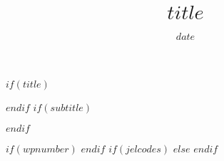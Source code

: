 
\setlength{\TPHorizModule}{1cm}
\setlength{\TPVertModule}{1cm}
\def\placefig#1#2#3#4{\begin{textblock}{.1}(#1,#2)\rlap{\texttt{[image: \#4]}}\end{textblock}}


$if(title)$
\title{$title$}
$endif$
$if(subtitle)$
\usepackage{etoolbox}
\makeatletter
\providecommand{\subtitle}[1]{%
  \apptocmd{\@title}{\par {\large #1 \par}}{}{}
}
\makeatother
\subtitle{$subtitle$}
$endif$
\date{$date$}

\def\Date{\number\day}
\def\Month{\ifcase\month\or
 January\or February\or March\or April\or May\or June\or
 July\or August\or September\or October\or November\or December\fi}
\def\Year{\number\year}


\makeatletter
\def\wp#1{\gdef\@wp{#1}}\def\@wp{??/??}
\def\jel#1{\gdef\@jel{#1}}\def\@jel{??}
\def\showjel{{\large\textsf{\textbf{JEL classification:}}~\@jel}}
\def\nojel{\def\showjel{}}
\makeatother

$if(wpnumber)$
\wp{$wpnumber$}
$endif$
$if(jelcodes)$
\jel{$jelcodes$}
$else$
\nojel
$endif$


\makeatletter
\def\cover{{\sffamily\setcounter{page}{0}
        \thispagestyle{empty}
        \placefig{13}{1.5}{width=5cm}{$companylogo$}
        \vspace*{4.5cm}
        \begin{center}
        \parbox{14cm}{\begin{onehalfspace}\centering\Huge\vspace*{0.3cm}
                \textsf{\textbf{\expandafter{\@title}}}\vspace{1cm}\par
                \LARGE
                \expandafter{$subtitle$}
                \expandafter{\@author}
                \end{onehalfspace}
        }
        \end{center}}}
        
